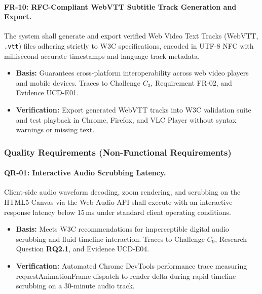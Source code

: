 \documentclass[conference]{IEEEtran}
\begin{document}
\paragraph{FR-10: RFC-Compliant WebVTT Subtitle Track Generation and Export.}
The system shall generate and export verified Web Video Text Tracks (WebVTT, \texttt{.vtt}) files adhering strictly to W3C specifications, encoded in UTF-8 NFC with millisecond-accurate timestamps and language track metadata.
\begin{itemize}
    \item \textbf{Basis:} Guarantees cross-platform interoperability across web video players and mobile devices. Traces to Challenge $C_3$, Requirement FR-02, and Evidence UCD-E01.
    \item \textbf{Verification:} Export generated WebVTT tracks into W3C validation suite and test playback in Chrome, Firefox, and VLC Player without syntax warnings or missing text.
\end{itemize}

\subsubsection{Quality Requirements (Non-Functional Requirements)}
\label{sec:design:req:qr}

\paragraph{QR-01: Interactive Audio Scrubbing Latency.}
Client-side audio waveform decoding, zoom rendering, and scrubbing on the HTML5 Canvas via the Web Audio API shall execute with an interactive response latency below 15\,ms under standard client operating conditions.
\begin{itemize}
    \item \textbf{Basis:} Meets W3C recommendations for imperceptible digital audio scrubbing and fluid timeline interaction. Traces to Challenge $C_9$, Research Question \textbf{RQ2.1}, and Evidence UCD-E04.
    \item \textbf{Verification:} Automated Chrome DevTools performance trace measuring requestAnimationFrame dispatch-to-render delta during rapid timeline scrubbing on a 30-minute audio track.
\end{itemize}
\end{document}

